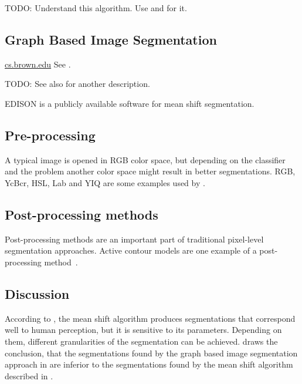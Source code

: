 TODO: Understand this algorithm. Use \cite{comaniciu2002mean} and
\cite{pantofaru2005comparison} for it.


\subsection{Graph Based Image Segmentation}\label{subsec:graph-based-image-segmentation}
\href{http://cs.brown.edu/~pff/segment/}{cs.brown.edu}
See \cite{felzenszwalb2004efficient}.

TODO: See also \cite{pantofaru2005comparison} for another description.

EDISON is a publicly available software for mean shift segmentation.\cite{christoudias2002synergism}


\subsection{Pre-processing}\label{subsec:preprocessing}
A typical image is opened in RGB color space, but depending on the classifier
and the problem another color space might result in better segmentations. RGB,
YcBcr, HSL, Lab and YIQ are some examples used by \cite{cohen2015memory}.

\subsection{Post-processing methods}\label{subsec:post-processing-methods}
Post-processing methods are an important part of traditional pixel-level
segmentation approaches. Active contour models are one example of a
post-processing method~\cite{kass1988snakes}.


\subsection{Discussion}\label{subsec:traditional-approaches-discussion}
According to \cite{pantofaru2005comparison}, the mean shift algorithm produces
segmentations that correspond well to human perception, but it is sensitive to
its parameters. Depending on them, different granularities of the segmentation
can be achieved. \cite{pantofaru2005comparison} draws the conclusion, that
the segmentations found by the graph based image segmentation approach
in \cite{felzenszwalb2004efficient} are inferior to the segmentations found
by the mean shift algorithm described in \cite{comaniciu2002mean}.
